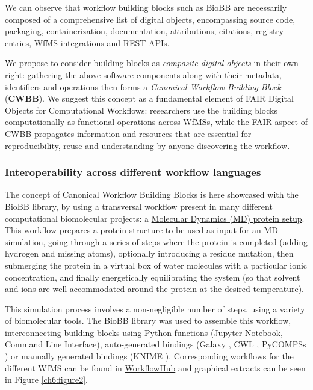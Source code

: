 We can observe that workflow building blocks such as BioBB are
necessarily composed of a comprehensive list of digital objects,
encompassing source code, packaging, containerization, documentation,
attributions, citations, registry entries, WfMS integrations and REST
APIs.

We propose to consider building blocks as \emph{composite digital
objects} in their own right: gathering the above software components
along with their metadata, identifiers and operations then forms a
\emph{Canonical Workflow Building Block} (\textbf{CWBB}). We suggest
this concept as a fundamental element of FAIR Digital Objects for
Computational Workflows: researchers use the building blocks
computationally as functional operations across WfMSs, while the FAIR
aspect of CWBB propagates information and resources that are essential
for reproducibility, reuse and understanding by anyone discovering the
workflow.

\subsubsection{Interoperability across different workflow
languages}\label{interoperability-across-different-workflow-languages}

The concept of Canonical Workflow Building Blocks is here showcased with
the BioBB library, by using a transversal workflow present in many
different computational biomolecular projects: a
\href{http://mmb.irbbarcelona.org/biobb/workflows/tutorials/md_setup}{Molecular
Dynamics (MD) protein setup}. This workflow prepares a protein structure
to be used as input for an MD simulation, going through a series of
steps where the protein is completed (adding hydrogen and missing
atoms), optionally introducing a residue mutation, then submerging the
protein in a virtual box of water molecules with a particular ionic
concentration, and finally energetically equilibrating the system (so
that solvent and ions are well accommodated around the protein at the
desired temperature).

This simulation process involves a non-negligible number of steps, using
a variety of biomolecular tools. The BioBB library was used to assemble
this workflow, interconnecting building blocks using Python functions
(Jupyter Notebook, Command Line Interface), auto-generated bindings
(Galaxy \cite{Afgan 2018}, CWL \cite{Crusoe 2022}, PyCOMPSs \cite{ch6-20}) or manually generated
bindings (KNIME \cite{ch6-21}). Corresponding workflows for the different
WfMS can be found in
\href{https://workflowhub.eu/collections/3}{WorkflowHub} \cite{ch6-22,ch6-23,ch6-24,ch6-25,ch6-26}
and graphical extracts can be seen in Figure \vref{ch6:figure2}.

